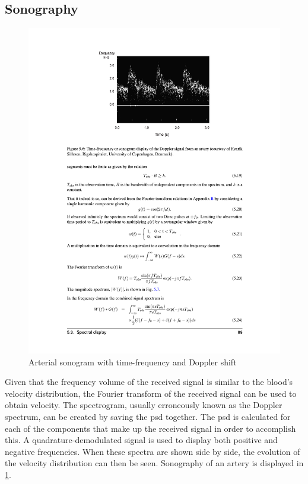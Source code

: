 \subsection{Sonography}
\begin{figure}[htbp]
	\centering
	\includegraphics[width=.8\textwidth]{Figures/2_estimation_sonogram_cph.pdf}
	\caption[Arterial sonogram with time-frequency and Doppler shift]{Arterial sonogram with time-frequency and Doppler shift \cite{JensenUltrasoundBook}}
	\label{fig:2_estimation_sonogram_cph}
\end{figure}

Given that the frequency volume of the received signal is similar to the blood's velocity distribution, the Fourier transform of the received signal can be used to obtain velocity. The spectrogram, usually erroneously known as the Doppler spectrum, can be created by saving the \gls{psd} together. The \gls{psd} is calculated for each of the components that make up the received signal in order to accomplish this. A quadrature-demodulated signal is used to display both positive and negative frequencies. When these spectra are shown side by side, the evolution of the velocity distribution can then be seen. Sonography of an artery is displayed in \cref{fig:2_estimation_sonogram_cph}.

